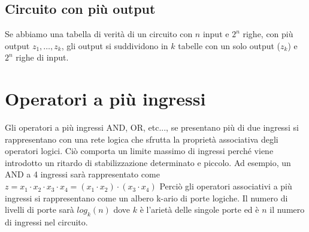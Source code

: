 \subsection{Circuito con più output}
Se abbiamo una tabella di verità di un circuito con $ n $ input e $ 2^n $ righe, con più output $ z_1, \dots, z_k $, gli output si suddividono in $ k $ tabelle con un solo output ($ z_k $) e $ 2^n $ righe di input.

\section{Operatori a più ingressi}
Gli operatori a più ingressi AND, OR, etc..., se presentano più di due ingressi si rappresentano con una rete logica che sfrutta la proprietà associativa degli operatori logici. Ciò comporta un limite massimo di ingressi perché viene introdotto un ritardo di stabilizzazione determinato e piccolo.
Ad esempio, un AND a 4 ingressi sarà rappresentato come $ z = x_1 \cdot x_2 \cdot x_3 \cdot x_4 = (x_1 \cdot x_2 ) \cdot (x_3 \cdot x_4)  $
Perciò gli operatori associativi a più ingressi si rappresentano come un albero k-ario di porte logiche. Il numero di livelli di porte sarà $ log_k(n) $ dove $ k $ è l'arietà delle singole porte ed è $ n $ il numero di ingressi nel circuito.


